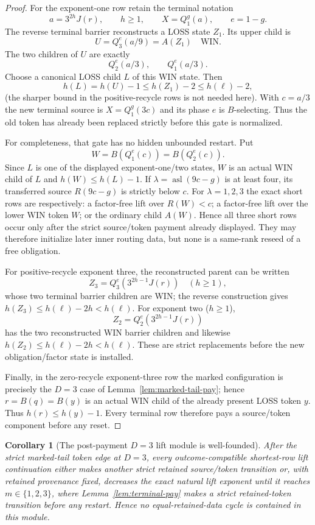 \documentclass[11pt]{article}
\newtheorem{corollary}[theorem]{Corollary}
\begin{document}
\begin{proof}
For the exponent-one row retain the terminal notation
\[
 a=3^{2h}J(r),\qquad h\ge1,\qquad X=Q_1^g(a),\qquad e=1-g.
\]
The reverse terminal barrier reconstructs a LOSS state $Z_1$.  Its upper
child is
\[
 U=Q_3^e(a/9)=A(Z_1)\quad\text{WIN}.
\]
The two children of $U$ are exactly
\[
 Q_2^e(a/3),\qquad Q_1^e(a/3).
\]
Choose a canonical LOSS child $L$ of this WIN state.  Then
\[
 h(L)=h(U)-1\le h(Z_1)-2\le h(\ell)-2,
\]
(the sharper bound in the positive-recycle rows is not needed here).  With
$c=a/3$ the new terminal source is $X=Q_1^g(3c)$ and its phase $e$ is
$B$-selecting.  Thus the old token has already been replaced strictly before
this gate is normalized.

For completeness, that gate has no hidden unbounded restart.  Put
\[
 W=B(Q_1^e(c))=B(Q_2^e(c)).
\]
Since $L$ is one of the displayed exponent-one/two states, $W$ is an actual
WIN child of $L$ and $h(W)\le h(L)-1$.  If
$\lambda=\operatorname{asl}(9c-g)$ is at least four, its transferred source
$R(9c-g)$ is strictly below $c$.  For $\lambda=1,2,3$ the exact short rows
are respectively: a factor-free lift over $R(W)<c$; a factor-free lift over
the lower WIN token $W$; or the ordinary child $A(W)$.  Hence all three
short rows occur only after the strict source/token payment already displayed.
They may therefore initialize later inner routing data, but none is a
same-rank reseed of a free obligation.

For positive-recycle exponent three, the reconstructed parent can be written
\[
 Z_3=Q_3^e(3^{2h-1}J(r))\quad(h\ge1),
\]
whose two terminal barrier children are WIN; the reverse construction gives
$h(Z_3)\le h(\ell)-2h<h(\ell)$.  For exponent two ($h\ge1$),
\[
 Z_2=Q_2^e(3^{2h-1}J(r))
\]
has the two reconstructed WIN barrier children and likewise
$h(Z_2)\le h(\ell)-2h<h(\ell)$.  These are strict replacements before the
new obligation/factor state is installed.

Finally, in the zero-recycle exponent-three row the marked configuration is
precisely the $D=3$ case of Lemma~\ref{lem:marked-tail-pay}; hence
$r=B(q)=B(y)$ is an actual WIN child of the already present LOSS token $y$.
Thus $h(r)\le h(y)-1$.  Every terminal row therefore pays a source/token
component before any reset.
\end{proof}

\begin{corollary}[The post-payment $D=3$ lift module is well-founded]
\label{cor:short-lift-closed}
After the strict marked-tail token edge at $D=3$, every outcome-compatible
shortest-row lift continuation either makes another strict retained
source/token transition or, with retained provenance fixed, decreases the
exact natural lift exponent until it reaches $m\in\{1,2,3\}$, where
Lemma~\ref{lem:terminal-pay} makes a strict retained-token transition before
any restart. Hence no equal-retained-data cycle is contained in this module.
\end{corollary}
\end{document}
